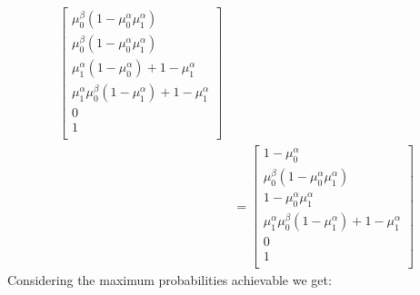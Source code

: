 \begin{align*}
\begin{bmatrix}
		                                        \mu_0^\beta(1 - \mu_0^\alpha \mu_1^\alpha)               \\
		                                        \mu_0^\beta(1 - \mu_0^\alpha \mu_1^\alpha)               \\
		                                        \hline
		                                        \mu_1^\alpha(1-\mu_0^\alpha) + 1-\mu_1^\alpha            \\
		                                        \mu_1^\alpha\mu_0^\beta(1-\mu_1^\alpha) + 1-\mu_1^\alpha \\
		                                        \hline
		                                        0                                                        \\
		                                        \hline
		                                        1                                                        \\
	                                        \end{bmatrix}    \\
	                                    & = \begin{bmatrix}
		                                        1 - \mu_0^\alpha                                         \\
		                                        \mu_0^\beta(1 - \mu_0^\alpha \mu_1^\alpha)               \\
		                                        \hline
		                                        1- \mu_0^\alpha\mu_1^\alpha                              \\
		                                        \mu_1^\alpha\mu_0^\beta(1-\mu_1^\alpha) + 1-\mu_1^\alpha \\
		                                        \hline
		                                        0                                                        \\
		                                        \hline
		                                        1                                                        \\
	                                        \end{bmatrix}
\end{align*}
Considering the maximum probabilities achievable we get:
